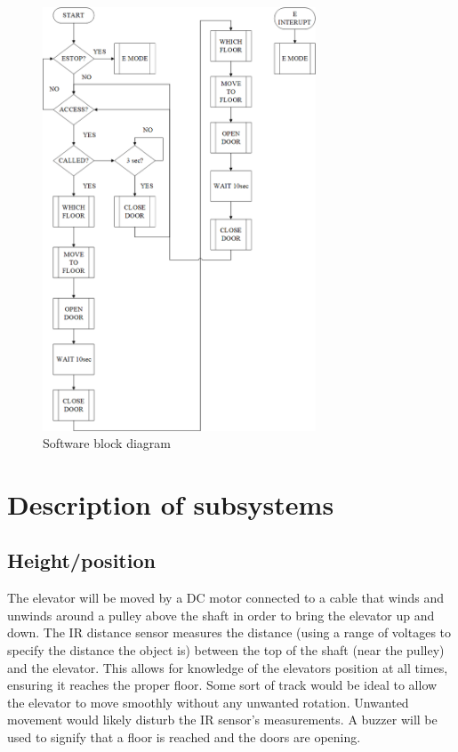 \documentclass{article}
\begin{document}
	\begin{figure}[h!]
	    \begin{center}
		\includegraphics[width=230pt]{swbd.png}
		\caption{Software block diagram}
		\label{fig:software_block_diagram}
		\end{center}
	\end{figure}

	\section{Description of subsystems}
	    \subsection{Height/position}
	    The elevator will be moved by a DC motor connected to a cable that winds and unwinds around a pulley above the shaft in order to bring the elevator up and down. The IR distance sensor measures the distance (using a range of voltages to specify the distance the object is) between the top of the shaft (near the pulley) and the elevator. This allows for knowledge of the elevators position at all times, ensuring it reaches the proper floor. Some sort of track would be ideal to allow the elevator to move smoothly without any unwanted rotation. Unwanted movement would likely disturb the IR sensor's measurements. A buzzer will be used to signify that a floor is reached and the doors are opening.
	    
\end{document}
